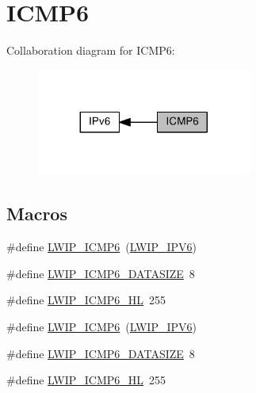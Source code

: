 \hypertarget{group__lwip__opts__icmp6}{}\section{I\+C\+M\+P6}
\label{group__lwip__opts__icmp6}
Collaboration diagram for I\+C\+M\+P6\+:
\nopagebreak
\begin{figure}[H]
\begin{center}
\leavevmode
\includegraphics[width=200pt]{group__lwip__opts__icmp6}
\end{center}
\end{figure}
\subsection*{Macros}
\begin{DoxyCompactItemize}
\item 
\#define \hyperlink{group__lwip__opts__icmp6_ga65ac8bcbad242cba3a2b557e1574b21f}{L\+W\+I\+P\+\_\+\+I\+C\+M\+P6}~(\hyperlink{openmote-cc2538_2lwip_2test_2fuzz_2lwipopts_8h_a872e3bb3fe2212156d66b18fccc9643f}{L\+W\+I\+P\+\_\+\+I\+P\+V6})
\item 
\#define \hyperlink{group__lwip__opts__icmp6_gaa88c55e37e5d7b865b91a9399313bbbf}{L\+W\+I\+P\+\_\+\+I\+C\+M\+P6\+\_\+\+D\+A\+T\+A\+S\+I\+ZE}~8
\item 
\#define \hyperlink{group__lwip__opts__icmp6_ga82193577b4045e1ac1533c4341a2bd79}{L\+W\+I\+P\+\_\+\+I\+C\+M\+P6\+\_\+\+HL}~255
\item 
\#define \hyperlink{group__lwip__opts__icmp6_ga65ac8bcbad242cba3a2b557e1574b21f}{L\+W\+I\+P\+\_\+\+I\+C\+M\+P6}~(\hyperlink{openmote-cc2538_2lwip_2test_2fuzz_2lwipopts_8h_a872e3bb3fe2212156d66b18fccc9643f}{L\+W\+I\+P\+\_\+\+I\+P\+V6})
\item 
\#define \hyperlink{group__lwip__opts__icmp6_gaa88c55e37e5d7b865b91a9399313bbbf}{L\+W\+I\+P\+\_\+\+I\+C\+M\+P6\+\_\+\+D\+A\+T\+A\+S\+I\+ZE}~8
\item 
\#define \hyperlink{group__lwip__opts__icmp6_ga82193577b4045e1ac1533c4341a2bd79}{L\+W\+I\+P\+\_\+\+I\+C\+M\+P6\+\_\+\+HL}~255
\end{DoxyCompactItemize}


